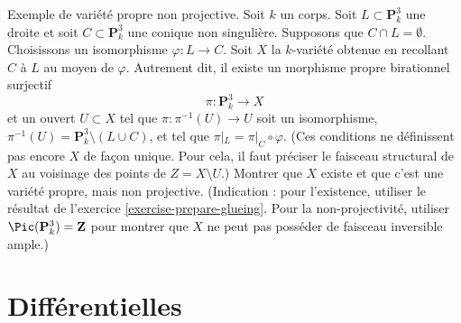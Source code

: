 \begin{exercise}
\label{exercise-nonprojective}
Exemple de variété propre non projective.
Soit $k$ un corps. Soit $L \subset \mathbf{P}^3_k$ une droite et
soit $C \subset \mathbf{P}^3_k$ une conique non singulière. Supposons que
$C \cap L = \emptyset$. Choisissons un
isomorphisme $\varphi : L \to C$. Soit $X$ la $k$-variété obtenue
en recollant $C$ à $L$ au moyen de $\varphi$. Autrement dit, il existe
un morphisme propre birationnel surjectif
$$
\pi : \mathbf{P}^3_k \longrightarrow X
$$
et un ouvert $U \subset X$ tel que $\pi : \pi^{-1}(U) \to U$ soit
un isomorphisme, $\pi^{-1}(U) = \mathbf{P}^3_k \setminus (L \cup C)$,
et tel que $\pi|_L = \pi|_C \circ \varphi$. (Ces conditions ne
définissent pas encore $X$ de façon unique. Pour cela, il faut préciser le
faisceau structural de $X$ au voisinage des points de $Z = X \setminus U$.)
Montrer que $X$ existe et que c'est une variété propre, mais non projective.
(Indication : pour l'existence, utiliser le résultat de
l'exercice \ref{exercise-prepare-glueing}. Pour la non-projectivité, utiliser
$\Pic(\mathbf{P}^3_k) = \mathbf{Z}$ pour montrer que $X$ ne peut pas posséder
de faisceau inversible ample.)
\end{exercise}



\section{Différentielles}
\label{section-differentials}

